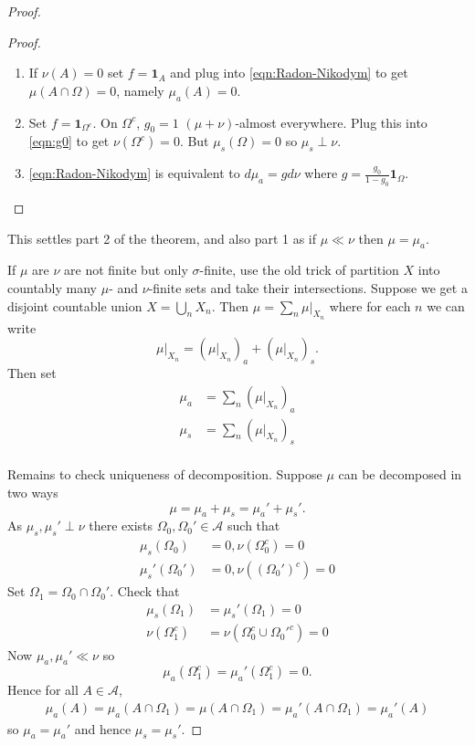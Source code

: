 \documentclass[a4paper]{article}
\begin{document}
\begin{proof}
  \begin{proof}\leavevmode
    \begin{enumerate}
    \item If \(\nu(A) = 0\) set \(f = \mathbf 1_A\) and plug into \eqref{eqn:Radon-Nikodym} to get \(\mu(A \cap \Omega) = 0\), namely \(\mu_a(A) = 0\).
    \item Set \(f = \mathbf 1_{\Omega^c}\). On \(\Omega^c\), \(g_0 = 1\) \((\mu + \nu)\)-almost everywhere. Plug this into \eqref{eqn:g0} to get \(\nu(\Omega^c) = 0\). But \(\mu_s(\Omega) = 0\) so \(\mu_s \perp \nu\).
    \item \eqref{eqn:Radon-Nikodym} is equivalent to \(d\mu_a = gd\nu\) where \(g = \frac{g_0}{1 - g_0} \mathbf 1_\Omega\).
    \end{enumerate}
  \end{proof}

  This settles part 2 of the theorem, and also part 1 as if \(\mu \ll \nu\) then \(\mu = \mu_a\).

  If \(\mu\) are \(\nu\) are not finite but only \(\sigma\)-finite, use the old trick of partition \(X\) into countably many \(\mu\)- and \(\nu\)-finite sets and take their intersections. Suppose we get a disjoint countable union \(X = \bigcup_n X_n\). Then \(\mu = \sum_n \mu|_{X_n}\) where for each \(n\) we can write
  \[
    \mu|_{X_n} = (\mu|_{X_n})_a + (\mu|_{X_n})_s.
  \]
  Then set
  \begin{align*}
    \mu_a &= \sum_n (\mu|_{X_n})_a \\
    \mu_s &= \sum_n (\mu|_{X_n})_s \\
  \end{align*}

  Remains to check uniqueness of decomposition. Suppose \(\mu\) can be decomposed in two ways
  \[
    \mu = \mu_a + \mu_s = \mu_a' + \mu_s'.
  \]
  As \(\mu_s, \mu_s' \perp \nu\) there exists \(\Omega_0, \Omega_0' \in \mathcal A\) such that
  \begin{align*}
    \mu_s(\Omega_0) &= 0, \nu(\Omega_0^c) = 0 \\
    \mu_s'(\Omega_0') &= 0, \nu((\Omega_0')^c) = 0
  \end{align*}
  Set \(\Omega_1 = \Omega_0 \cap \Omega_0'\). Check that
  \begin{align*}
    \mu_s(\Omega_1) &= \mu_s'(\Omega_1) = 0 \\
    \nu(\Omega_1^c) &= \nu(\Omega_0^c \cup \Omega_0'^c) = 0
  \end{align*}
  Now \(\mu_a, \mu_a' \ll \nu\) so
  \[
    \mu_a(\Omega_1^c) = \mu_a'(\Omega_1^c) = 0.
  \]
  Hence for all \(A \in \mathcal A\),
  \begin{align*}
    \mu_a(A)
    = \mu_a(A \cap \Omega_1)
    = \mu(A \cap \Omega_1)
    = \mu_a'(A \cap \Omega_1)
    = \mu_a'(A)
  \end{align*}
  so \(\mu_a = \mu_a'\) and hence \(\mu_s = \mu_s'\).
\end{proof}
\end{document}
